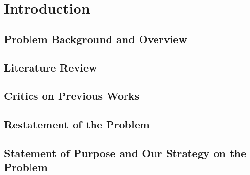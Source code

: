 \section{Introduction}

\subsection{Problem Background and Overview}


\subsection{Literature Review}


\subsection{Critics on Previous Works}


\subsection{Restatement of the Problem}


\subsection{Statement of Purpose and Our Strategy on the Problem}